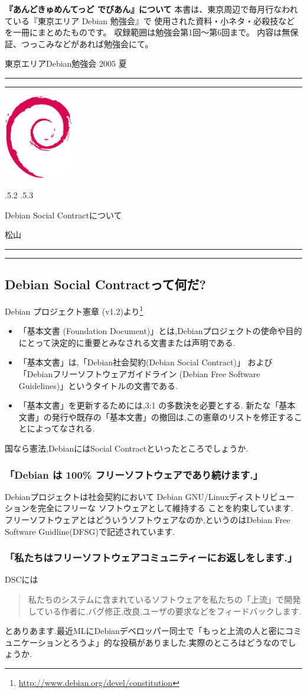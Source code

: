 \documentclass[mingoth,a4paper]{jsarticle}
\makeatletter
\renewcommand{\section}{\@startsection{section}{1}{\z@}%
    {\Cvs \@plus.5\Cdp \@minus.2\Cdp}%
    {.5\Cvs \@plus.3\Cdp}%
    {\normalfont\Large\headfont\raggedright\centering}} %
\newcommand{\dancersection}[2]{%
\newpage
東京エリアDebian勉強会 2005 夏
\hrule
\vspace{0.5mm}
\hrule
\hfill{}\includegraphics[width=3cm]{image200502/openlogo-nd.eps}\\
\vspace{-4cm}
\begin{center}
  \section{#1}
\end{center}
\hfill{}#2\hspace{3cm}\space\\
\hrule
\hrule
\vspace{1cm}
}
\makeatother
\begin{document}
\newpage
\setcounter{tocdepth}{1}
\tableofcontents
\vspace{6cm}

\large
\begin{itembox}{\bf『あんどきゅめんてっど でびあん』について}
本書は、東京周辺で毎月行なわれている『東京エリア Debian 勉強会』で
使用された資料・小ネタ・必殺技などを一冊にまとめたものです。
収録範囲は勉強会第1回〜第6回まで。
内容は無保証、つっこみなどがあれば勉強会にて。
\end{itembox}
\normalfont

\dancersection{Debian Social Contractについて}{松山}

\subsection{Debian Social Contractって何だ?}
Debian プロジェクト憲章 (v1.2)より\footnote{\url{http://www.debian.org/devel/constitution}}
\begin{itemize}
\item「基本文書 (Foundation Document)」とは,Debianプロジェクトの使命や目的にとって決定的に重要とみなされる文書または声明である.
\item「基本文書」は,「Debian社会契約(Debian Social Contract)」
および「Debianフリーソフトウェアガイドライン (Debian Free Software Guidelines)」というタイトルの文書である.
\item「基本文書」を更新するためには,3:1 の多数決を必要とする.
新たな「基本文書」の発行や既存の「基本文書」の撤回は,この憲章のリストを修正することによってなされる.
\end{itemize}
国なら憲法,DebianにはSocial Contractといったところでしょうか.

\subsubsection{「Debian は 100\% フリーソフトウェアであり続けます.」}
Debianプロジェクトは社会契約において
Debian GNU/Linuxディストリビューションを完全にフリーな ソフトウェアとして維持する
ことを約束しています.
フリーソフトウェアとはどういうソフトウェアなのか,というのはDebian Free Software Guidline(DFSG)で記述されています.

\subsubsection{「私たちはフリーソフトウェアコミュニティーにお返しをします.」}
DSCには
\begin{quote}
私たちのシステムに含まれているソフトウェアを私たちの「上流」で開発している作者に,バグ修正,改良,ユーザの要求などをフィードバックします.
\end{quote}
とありあます.最近MLにDebianデベロッパー同士で「もっと上流の人と密にコミュニケーションとろうよ」的な投稿がありました.実際のところはどうなのでしょうか.
\end{document}

